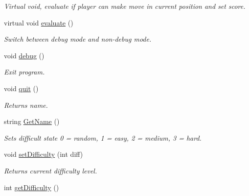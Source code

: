 \begin{DoxyCompactItemize}
\begin{DoxyCompactList}\small\item\em Virtual void, evaluate if player can make move in current position and set score. \end{DoxyCompactList}\item 
\hypertarget{class_game_a3bc8822cacd9cf8c5f71021072eb24a4}{virtual void \hyperlink{class_game_a3bc8822cacd9cf8c5f71021072eb24a4}{evaluate} ()}\label{class_game_a3bc8822cacd9cf8c5f71021072eb24a4}

\begin{DoxyCompactList}\small\item\em Switch between debug mode and non-\/debug mode. \end{DoxyCompactList}\item 
\hypertarget{class_game_a29997a321e10a5456f0aef9e95c51757}{void \hyperlink{class_game_a29997a321e10a5456f0aef9e95c51757}{debug} ()}\label{class_game_a29997a321e10a5456f0aef9e95c51757}

\begin{DoxyCompactList}\small\item\em Exit program. \end{DoxyCompactList}\item 
\hypertarget{class_game_a8272be134d16c277bb014ad6a22fc357}{void \hyperlink{class_game_a8272be134d16c277bb014ad6a22fc357}{quit} ()}\label{class_game_a8272be134d16c277bb014ad6a22fc357}

\begin{DoxyCompactList}\small\item\em Returns name. \end{DoxyCompactList}\item 
\hypertarget{class_game_ab81299d944d2779d482067640e576389}{string \hyperlink{class_game_ab81299d944d2779d482067640e576389}{Get\-Name} ()}\label{class_game_ab81299d944d2779d482067640e576389}

\begin{DoxyCompactList}\small\item\em Sets difficult state 0 = random, 1 = easy, 2 = medium, 3 = hard. \end{DoxyCompactList}\item 
\hypertarget{class_game_ae8ac0005c039f0f5f2dd1c10a299fe8d}{void \hyperlink{class_game_ae8ac0005c039f0f5f2dd1c10a299fe8d}{set\-Difficulty} (int diff)}\label{class_game_ae8ac0005c039f0f5f2dd1c10a299fe8d}

\begin{DoxyCompactList}\small\item\em Returns current difficulty level. \end{DoxyCompactList}\item 
\hypertarget{class_game_a2c0efe888e453a7fc0e644503fbd6316}{int \hyperlink{class_game_a2c0efe888e453a7fc0e644503fbd6316}{get\-Difficulty} ()}\label{class_game_a2c0efe888e453a7fc0e644503fbd6316}


\end{DoxyCompactItemize}
